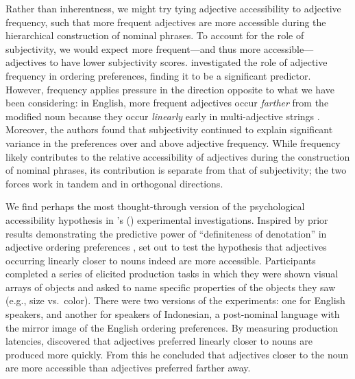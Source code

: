 \documentclass[preprint,authoryear]{elsarticle}\frenchspacing
\newcommand{\jd}[1]{\textcolor{Blue}{[jd: #1]}}
\begin{document}
Rather than inherentness, we might try tying adjective accessibility to adjective frequency, such that more frequent adjectives are more accessible during the hierarchical construction of nominal phrases. To account for the role of subjectivity, we would expect more frequent---and thus more accessible---adjectives to have lower subjectivity scores. \citeauthor{scontrasetal2017adjectives} investigated the role of adjective frequency in ordering preferences, finding it to be a significant predictor. However, frequency applies pressure in the direction opposite to what we have been considering: in English, more frequent adjectives occur \emph{farther} from the modified noun because they occur \emph{linearly} early in multi-adjective strings \citep[cf.][]{bock1982,wulff2003}. 
Moreover, the authors found that subjectivity continued to explain significant variance in the preferences over and above adjective frequency. While frequency likely contributes to the relative accessibility of adjectives during the construction of nominal phrases, its contribution is separate from that of subjectivity; the two forces work in tandem and in orthogonal directions. %

We find perhaps the most thought-through version of the psychological accessibility hypothesis in \citeauthor{martin1969competence}'s (\citeyear{martin1969competence}) experimental investigations. Inspired by prior results demonstrating the predictive power of ``definiteness of denotation'' in adjective ordering preferences \citep{martin1969}, \citeauthor{martin1969competence} set out to test the hypothesis that adjectives occurring linearly closer to nouns indeed are more accessible. Participants completed a series of elicited production tasks in which they were shown visual arrays of objects and asked to name specific properties of the objects they saw (e.g., size vs.~color). There were two versions of the experiments: one for English speakers, and another for speakers of Indonesian, a post-nominal language with the mirror image of the English ordering preferences. By measuring production latencies, \citeauthor{martin1969competence} discovered that adjectives preferred linearly closer to nouns are produced more quickly. From this he concluded that adjectives closer to the noun are more accessible than adjectives preferred farther away. 
\end{document}
